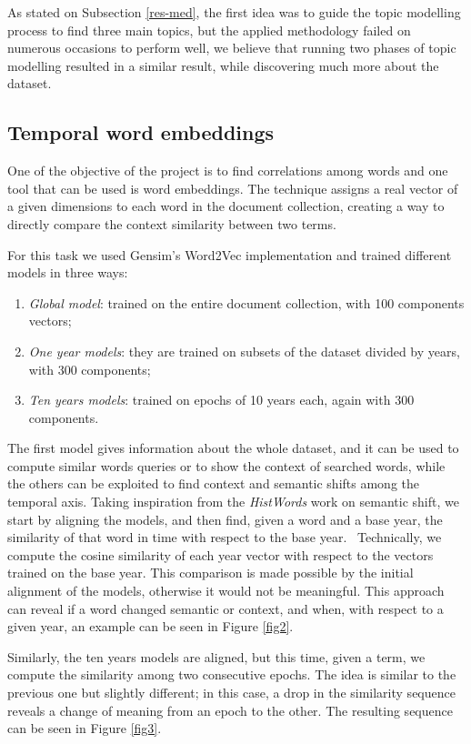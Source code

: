 As stated on Subsection \vref{res-med}, the first idea was to guide the topic modelling
process to find three main topics, but the applied methodology failed on numerous occasions to 
perform well, we believe that running two phases of topic modelling resulted in a similar result, 
while discovering much more about the dataset. 

\subsection{Temporal word embeddings}

One of the objective of the project is to find correlations among words and one tool 
that can be used is word embeddings. The technique assigns a real vector of a given dimensions
to each word in the document collection, creating a way to directly compare the context 
similarity between two terms.

 For this task we used Gensim's Word2Vec implementation and trained different models 
in three ways:
\begin{enumerate}
    \item \emph{Global model}: trained on the entire document collection, with 100 components vectors;
    \item \emph{One year models}: they are trained on subsets of the dataset divided by years, with 300 components;
    \item \emph{Ten years models}: trained on epochs of 10 years each, again with 300 components.
\end{enumerate}
The first model gives information about the whole dataset, and it can be used to compute
similar words queries or to show the context of searched words, while the others can be exploited to find context
and semantic shifts among the temporal axis.
Taking inspiration from the \emph{HistWords} work on semantic shift, we start by aligning the models, 
and then find, given a word and a base year, the similarity of that word in time with respect 
to the base year.~\cite{hist-words} 
Technically, we compute the cosine similarity of each year vector 
with respect to the vectors trained on the base year. This comparison is made possible by the 
initial alignment of the models, otherwise it would not be meaningful.
This approach can reveal if a word changed semantic or context, and when, 
with respect to a given year, an example can be seen in Figure \vref{fig2}.

Similarly, the ten years models are aligned, but this time, given a term, we compute the
similarity among two consecutive epochs. The idea is similar to the previous one but slightly 
different; in this case, a drop in the similarity sequence
reveals a change of meaning from an epoch to the other. The resulting
sequence can be seen in Figure \vref{fig3}.

